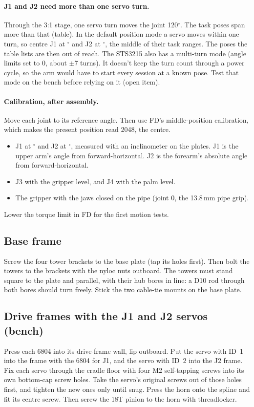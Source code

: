 \documentclass[10pt]{article}
\begin{document}
\paragraph{J1 and J2 need more than one servo turn.} Through the 3:1 stage, one servo turn moves the joint 120$^\circ$.
The task poses span more than that (table). In the default position mode a servo moves within one turn, so centre J1 at
\MidJOne$^\circ$ and J2 at \MidJTwo$^\circ$, the middle of their task ranges. The poses the table lists are then out of
reach. The STS3215 also has a multi-turn mode (angle limits set to 0, about $\pm$7 turns). It doesn't keep the turn count
through a power cycle, so the arm would have to start every session at a known pose. Test that mode on the bench before
relying on it (open item).

\paragraph{Calibration, after assembly.} Move each joint to its reference angle. Then use FD's middle-position
calibration, which makes the present position read 2048, the centre.
\begin{itemize}\itemsep0pt
  \item J1 at \MidJOne$^\circ$ and J2 at \MidJTwo$^\circ$, measured with an inclinometer on the plates. J1 is the upper
  arm's angle from forward-horizontal. J2 is the forearm's absolute angle from forward-horizontal.
  \item J3 with the gripper level, and J4 with the palm level.
  \item The gripper with the jaws closed on the pipe (joint 0, the 13.8\,mm pipe grip).
\end{itemize}
Lower the torque limit in FD for the first motion tests.

\newcommand{\step}[2]{\subsection{#1}\def\steplater{\buildstep{#2}}}
\step{Base frame}{base}
Screw the four tower brackets to the base plate (tap its holes first). Then bolt the towers to the brackets with the
nyloc nuts outboard. The towers must stand square to the plate and parallel, with their hub bores in line: a D10 rod
through both bores should turn freely. Stick the two cable-tie mounts on the base plate.
\steplater

\step{Drive frames with the J1 and J2 servos (bench)}{drive_frames}
Press each 6804 into its drive-frame wall, lip outboard. Put the servo with ID~1 into the frame with the 6804 for J1, and
the servo with ID~2 into the J2 frame. Fix each servo through the cradle floor with four M2 self-tapping screws into its
own bottom-cap screw holes. Take the servo's original screws out of those holes first, and tighten the new ones only until
snug. Press the horn onto the spline and fit its centre screw. Then screw the 18T pinion to the horn with threadlocker.
\steplater
\end{document}
